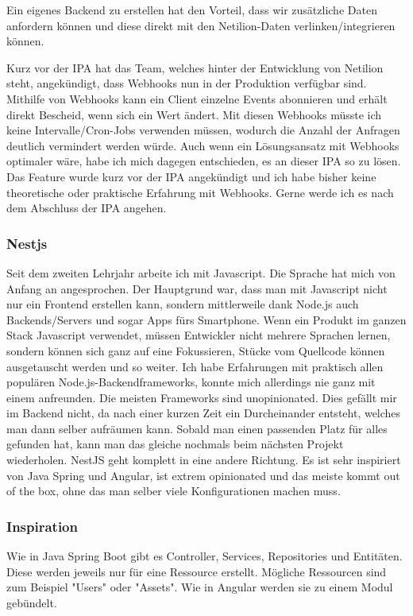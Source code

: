 Ein eigenes Backend zu erstellen hat den Vorteil, dass wir zusätzliche Daten anfordern können und diese direkt mit den Netilion-Daten verlinken/integrieren können.


Kurz vor der IPA hat das Team, welches hinter der Entwicklung von Netilion steht, angekündigt, dass Webhooks nun in der Produktion verfügbar sind. Mithilfe von Webhooks kann ein Client einzelne Events abonnieren und erhält direkt Bescheid, wenn sich ein Wert ändert. Mit diesen Webhooks müsste ich keine Intervalle/Cron-Jobs verwenden müssen, wodurch die Anzahl der Anfragen deutlich vermindert werden würde.
\newline
Auch wenn ein Lösungsansatz mit Webhooks optimaler wäre, habe ich mich dagegen entschieden, es an dieser IPA so zu lösen. Das Feature wurde kurz vor der IPA angekündigt und ich habe bisher keine theoretische oder praktische Erfahrung mit Webhooks. Gerne werde ich es nach dem Abschluss der IPA angehen.
\subsubsection{Nestjs}
Seit dem zweiten Lehrjahr arbeite ich mit Javascript. Die Sprache hat mich von Anfang an angesprochen. Der Hauptgrund war, dass man mit Javascript nicht nur ein Frontend erstellen kann, sondern mittlerweile dank Node.js auch Backends/Servers und sogar Apps fürs Smartphone. Wenn ein Produkt im ganzen Stack Javascript verwendet, müssen Entwickler nicht mehrere Sprachen lernen, sondern können sich ganz auf eine Fokussieren, Stücke vom Quellcode können ausgetauscht werden und so weiter.
\newline
Ich habe Erfahrungen mit praktisch allen populären Node.js-Backendframeworks, konnte mich allerdings nie ganz mit einem anfreunden. Die meisten Frameworks sind unopinionated. Dies gefällt mir im Backend nicht, da nach einer kurzen Zeit ein Durcheinander entsteht, welches man dann selber aufräumen kann. Sobald man einen passenden Platz für alles gefunden hat, kann man das gleiche nochmals beim nächsten Projekt wiederholen.
\newline
NestJS geht komplett in eine andere Richtung. Es ist sehr inspiriert von Java Spring und Angular, ist extrem opinionated und das meiste kommt out of the box, ohne das man selber viele Konfigurationen machen muss.
\subsubsection{Inspiration}
Wie in Java Spring Boot gibt es Controller, Services, Repositories und Entitäten. Diese werden jeweils nur für eine Ressource erstellt. Mögliche Ressourcen sind zum Beispiel "Users" oder "Assets". Wie in Angular werden sie zu einem Modul gebündelt.
